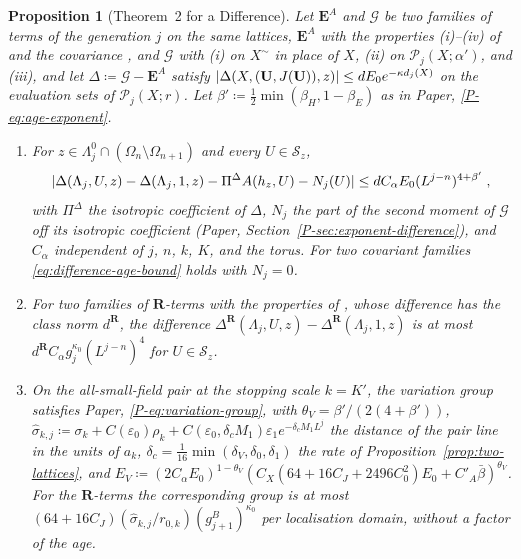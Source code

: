 \documentclass[11pt]{preprint}
\DeclarePairedDelimiter{\abs}{\lvert}{\rvert}
\numberwithin{equation}{section}
\newtheorem{proposition}{Proposition}
\theoremstyle{definition}
\theoremstyle{remark}
\theoremstyle{plain}
\begin{document}
\begin{proposition}[Theorem~2 for a Difference]\label{prop:theorem-two-difference}
Let $\mathbf E^A$ and $\mathcal G$ be two families of terms of the generation $j$ on the same lattices, $\mathbf E^A$ with the properties (i)--(iv) of \cite[p.~259]{BalabanCRE} and the covariance \cite[(2.29)]{BalabanCRE}, and $\mathcal G$ with (i) on $X^\sim$ in place of $X$, (ii) on $\mathcal P_j(X; \alpha')$, and (iii), and let $\Delta \coloneqq \mathcal G - \mathbf E^A$ satisfy $\abs{\Delta(X, (\mathbf U, J(\mathbf U)), z)} \leq dE_0e^{-\kappa d_j(X)}$ on the evaluation sets of $\mathcal P_j(X; r)$. Let $\beta' \coloneqq \frac12\min(\beta_H, 1 - \beta_E)$ as in Paper, \eqref{P-eq:age-exponent}.
\begin{enumerate}[label=(\alph*)]
\item For $z \in \Lambda^0_j \cap (\Omega_n \setminus \Omega_{n+1})$ and every $U \in \mathcal S_z$,
\begin{equation}\label{eq:difference-age-bound}
    \abs{\Delta(\Lambda_j, U, z) - \Delta(\Lambda_j, 1, z) - \Pi^\Delta A(h_z, U) - N_j(U)} \leq dC_\alpha E_0(L^{j-n})^{4+\beta'}\;,
\end{equation}
with $\Pi^\Delta$ the isotropic coefficient of $\Delta$, $N_j$ the part of the second moment of $\mathcal G$ off its isotropic coefficient (Paper, Section~\ref{P-sec:exponent-difference}), and $C_\alpha$ independent of $j$, $n$, $k$, $K$, and the torus. For two covariant families \eqref{eq:difference-age-bound} holds with $N_j = 0$.
\item For two families of $\mathbf R$-terms with the properties of \cite[p.~260, ll.~18--25]{BalabanCRE}, whose difference has the class norm $d^{\mathbf R}$, the difference $\Delta^{\mathbf R}(\Lambda_j, U, z) - \Delta^{\mathbf R}(\Lambda_j, 1, z)$ is at most $d^{\mathbf R}C_\alpha g_j^{\kappa_0}(L^{j-n})^4$ for $U \in \mathcal S_z$.
\item On the all-small-field pair at the stopping scale $k = K'$, the variation group satisfies Paper, \eqref{P-eq:variation-group}, with $\theta_V = \beta'/(2(4 + \beta'))$, $\hat\sigma_{k,j} \coloneqq \sigma_k + C(\varepsilon_0)\rho_k + C(\varepsilon_0, \delta_cM_1)\varepsilon_1e^{-\delta_cM_1L^j}$ the distance of the pair line in the units of $a_k$, $\delta_c = \frac{1}{16}\min(\delta_V, \delta_0, \delta_1)$ the rate of Proposition~\ref{prop:two-lattices}, and $E_V \coloneqq (2C_\alpha E_0)^{1-\theta_V}(C_X(64 + 16C_J + 2496C_0^2)E_0 + C'_A\bar\beta)^{\theta_V}$. For the $\mathbf R$-terms the corresponding group is at most $(64 + 16C_J)(\hat\sigma_{k,j}/r_{0,k})(g^B_{j+1})^{\kappa_0}$ per localisation domain, without a factor of the age.

\end{enumerate}
\end{proposition}
\end{document}
